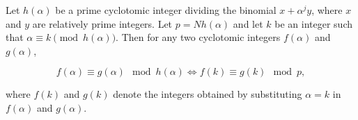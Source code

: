 Let $h(\alpha)$ be a prime cyclotomic integer dividing the binomial $x + \alpha^j y$, where $x$ and $y$ are relatively prime integers. Let $p = Nh(\alpha)$ and let $k$ be an integer such that $\alpha \equiv k \pmod{h(\alpha)}$. Then for any two cyclotomic integers $f(\alpha)$ and $g(\alpha)$,

$$f(\alpha) \equiv g(\alpha) \mod h(\alpha) \iff f(k) \equiv g(k) \mod p,$$

where $f(k)$ and $g(k)$ denote the integers obtained by substituting $\alpha = k$ in $f(\alpha)$ and $g(\alpha)$.
